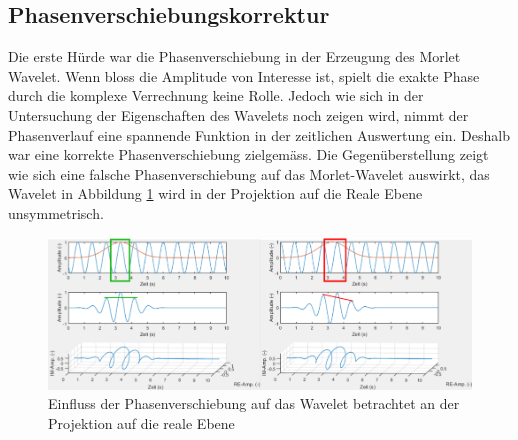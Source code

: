 \subsection{Phasenverschiebungskorrektur
	\label{wavelets:subsection:Phasenverschiebung}}
Die erste Hürde war die Phasenverschiebung in der Erzeugung des Morlet Wavelet. Wenn bloss die Amplitude von Interesse ist, spielt die exakte Phase durch die komplexe Verrechnung keine Rolle. Jedoch wie sich in der Untersuchung der Eigenschaften des Wavelets noch zeigen wird, nimmt der Phasenverlauf eine spannende Funktion in der zeitlichen Auswertung ein. Deshalb war eine korrekte Phasenverschiebung zielgemäss. Die Gegenüberstellung zeigt wie sich eine falsche Phasenverschiebung auf das Morlet-Wavelet auswirkt, das Wavelet in Abbildung \ref{wavelet:fig:PhaseShiftFailVsCor} wird in der Projektion auf die Reale Ebene unsymmetrisch.

\begin{figure}
	\centering
	\includegraphics[width=\textwidth]{papers/wavelets/images/9_PhaseShiftFailVsCor.png}
	\caption{Einfluss der Phasenverschiebung auf das Wavelet betrachtet an der Projektion auf die reale Ebene}
	\label{wavelet:fig:PhaseShiftFailVsCor}
\end{figure}

